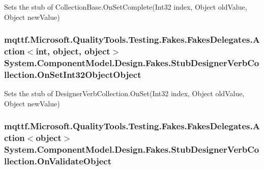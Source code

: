 Sets the stub of Collection\-Base.\-On\-Set\-Complete(\-Int32 index, Object old\-Value, Object new\-Value)

\hypertarget{class_system_1_1_component_model_1_1_design_1_1_fakes_1_1_stub_designer_verb_collection_a26cbb78d9baf5a46e437ab24d4f6ccbf}{
\subsubsection[{On\-Set\-Int32\-Object\-Object}]{\setlength{\rightskip}{0pt plus 5cm}mqttf.\-Microsoft.\-Quality\-Tools.\-Testing.\-Fakes.\-Fakes\-Delegates.\-Action$<$int, object, object$>$ System.\-Component\-Model.\-Design.\-Fakes.\-Stub\-Designer\-Verb\-Collection.\-On\-Set\-Int32\-Object\-Object}}\label{class_system_1_1_component_model_1_1_design_1_1_fakes_1_1_stub_designer_verb_collection_a26cbb78d9baf5a46e437ab24d4f6ccbf}


Sets the stub of Designer\-Verb\-Collection.\-On\-Set(\-Int32 index, Object old\-Value, Object new\-Value)

\hypertarget{class_system_1_1_component_model_1_1_design_1_1_fakes_1_1_stub_designer_verb_collection_a52b54d0f460301ba4da167b658cba09b}{
\subsubsection[{On\-Validate\-Object}]{\setlength{\rightskip}{0pt plus 5cm}mqttf.\-Microsoft.\-Quality\-Tools.\-Testing.\-Fakes.\-Fakes\-Delegates.\-Action$<$object$>$ System.\-Component\-Model.\-Design.\-Fakes.\-Stub\-Designer\-Verb\-Collection.\-On\-Validate\-Object}}\label{class_system_1_1_component_model_1_1_design_1_1_fakes_1_1_stub_designer_verb_collection_a52b54d0f460301ba4da167b658cba09b}


